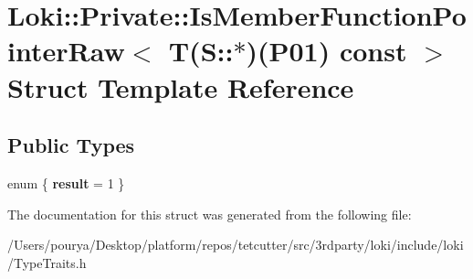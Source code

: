 \hypertarget{structLoki_1_1Private_1_1IsMemberFunctionPointerRaw_3_01T_07S_1_1_5_08_07P01_08_01const_01_01_4}{}\section{Loki\+:\+:Private\+:\+:Is\+Member\+Function\+Pointer\+Raw$<$ T(S\+:\+:$\ast$)(P01) const $>$ Struct Template Reference}
\label{structLoki_1_1Private_1_1IsMemberFunctionPointerRaw_3_01T_07S_1_1_5_08_07P01_08_01const_01_01_4}
\subsection*{Public Types}
\begin{DoxyCompactItemize}
\item 
\hypertarget{structLoki_1_1Private_1_1IsMemberFunctionPointerRaw_3_01T_07S_1_1_5_08_07P01_08_01const_01_01_4_aabba02593e01306f2708493985cd6213}{}enum \{ {\bfseries result} = 1
 \}\label{structLoki_1_1Private_1_1IsMemberFunctionPointerRaw_3_01T_07S_1_1_5_08_07P01_08_01const_01_01_4_aabba02593e01306f2708493985cd6213}

\end{DoxyCompactItemize}


The documentation for this struct was generated from the following file\+:\begin{DoxyCompactItemize}
\item 
/\+Users/pourya/\+Desktop/platform/repos/tetcutter/src/3rdparty/loki/include/loki/Type\+Traits.\+h\end{DoxyCompactItemize}
